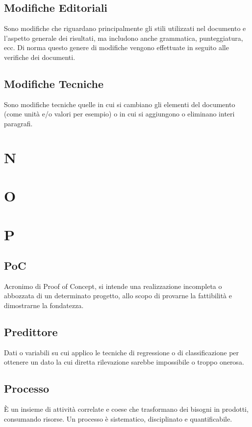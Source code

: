\subsection*{Modifiche Editoriali}
Sono modifiche che riguardano principalmente gli stili utilizzati nel documento e l'aspetto generale dei risultati, ma includono anche grammatica, punteggiatura, ecc. Di norma questo genere di modifiche vengono effettuate in seguito alle verifiche dei documenti.

\subsection*{Modifiche Tecniche}
Sono modifiche tecniche quelle in cui si cambiano gli elementi del documento (come unità e/o valori per esempio) o in cui si aggiungono o eliminano interi paragrafi.

\clearpage
\section*{N}

\clearpage
\section*{O}

\clearpage
\section*{P}

\subsection*{PoC}
Acronimo di Proof of Concept, si intende una realizzazione incompleta o abbozzata di un determinato progetto, allo scopo di provarne la fattibilità e dimostrarne la fondatezza.

\subsection*{Predittore}
Dati o variabili su cui applico le tecniche di regressione o di classificazione per ottenere un dato la cui diretta rilevazione sarebbe impossibile o troppo onerosa.

\subsection*{Processo}
È un insieme di attività correlate e coese che trasformano dei bisogni in prodotti, consumando risorse. Un processo è sistematico, disciplinato e quantificabile.

